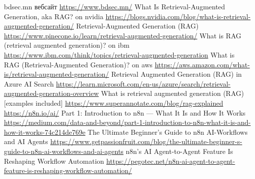 \documentclass[12pt,A4]{report}
\begin{document}
\begin{thebibliography}{}
    bdsec.mn вебсайт \url{https://www.bdsec.mn/}
    What Is Retrieval-Augmented Generation, aka RAG? on nvidia
    \url{https://blogs.nvidia.com/blog/what-is-retrieval-augmented-generation/}
    Retrieval-Augmented Generation (RAG)
    \url{https://www.pinecone.io/learn/retrieval-augmented-generation/}
    What is RAG (retrieval augmented generation)? on ibm \url{https://www.ibm.com/think/topics/retrieval-augmented-generation}
    What is RAG (Retrieval-Augmented Generation)? on aws
     \url{https://aws.amazon.com/what-is/retrieval-augmented-generation/}
    Retrieval Augmented Generation (RAG) in Azure AI Search
     \url{https://learn.microsoft.com/en-us/azure/search/retrieval-augmented-generation-overview}
    What is retrieval augmented generation (RAG) [examples included]
    \url{https://www.superannotate.com/blog/rag-explained}
    \url{https://n8n.io/ai/}
    Part 1: Introduction to n8n — What It Is and How It Works
    \url{https://medium.com/data-and-beyond/part-1-introduction-to-n8n-what-it-is-and-how-it-works-74c214de769e}
    The Ultimate Beginner's Guide to n8n AI-Workflows and AI Agents
    \url{https://www.getpassionfruit.com/blog/the-ultimate-beginner-s-guide-to-n8n-ai-workflows-and-ai-agents}
    n8n’s AI Agent-to-Agent Feature Is Reshaping Workflow Automation
    \url{https://pegotec.net/n8n-ai-agent-to-agent-feature-is-reshaping-workflow-automation/}
\end{thebibliography}

\end{document}
